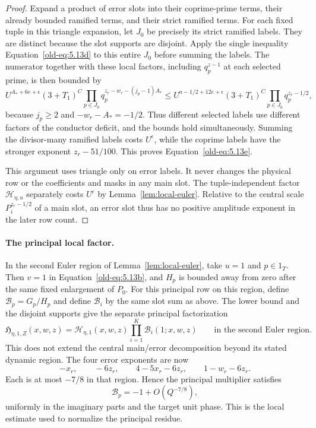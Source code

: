 \documentclass[11pt,a4paper]{article}
\numberwithin{equation}{section}
\numberwithin{figure}{section}
\theoremstyle{definition}
\theoremstyle{remark}
\begin{document}
\begin{proof}
Expand a product of error slots into their coprime-prime terms,
their already bounded ramified terms, and their strict ramified
terms.  For each fixed tuple in this triangle expansion, let $J_0$
be precisely its strict ramified labels.  They are distinct because
the slot supports are disjoint.  Apply the single inequality
Equation~\eqref{old-eq:5.13d} to this entire $J_0$ before summing
the labels.  The numerator together with these local factors,
including $q_p^{z-1}$ at each selected prime, is then bounded by
\[
 U^{A_*+6e+\epsilon}(3+T_1)^C
 \prod_{p\in J_0}q_p^{z_r-w_r-(j_p-1)A_*}
 \le U^{a-1/2+12e+\epsilon}(3+T_1)^C
       \prod_{p\in J_0}q_p^{z_r-1/2},
\]
because $j_p\ge2$ and $-w_r-A_*=-1/2$.  Thus different selected
labels use different factors of the conductor deficit, and the
bounds hold simultaneously.  Summing the divisor-many ramified labels costs
$U^\epsilon$, while the coprime labels have the stronger exponent
$z_r-51/100$.  This proves Equation~\eqref{old-eq:5.13e}.

This argument uses triangle only on error labels.  It never changes
the physical row or the coefficients and masks in any main slot.
The tuple-independent factor $\mathcal H_{\eta,u}$ separately costs
$U^\epsilon$ by Lemma~\ref{lem:local-euler}.  Relative to the
central scale $P_i^{z_r-1/2}$ of a main slot, an error slot thus
has no positive amplitude exponent in the later row count.
\end{proof}

\paragraph{The principal local factor.}
In the second Euler region of Lemma~\ref{lem:local-euler}, take
$u=1$ and $p\in1_T$.  Then $v=1$ in
Equation~\eqref{old-eq:5.13b}, and $H_p$ is bounded away from zero
after the same fixed enlargement of $P_0$.  For this principal row on
this region, define $\mathcal B_p=G_p/H_p$ and define $\mathcal B_i$
by the same slot sum as above.  The lower bound and the disjoint supports
give the separate principal factorization
\begin{equation}\label{eq:principal-slot-factorization}
 \mathfrak H_{\eta,1,Z}(x,w,z)
 =\mathcal H_{\eta,1}(x,w,z)\prod_{i=1}^K\mathcal B_i(1;x,w,z)
 \qquad\text{in the second Euler region}.
\end{equation}
This does not extend the central main/error decomposition beyond its stated
dynamic region.  The four error
exponents are now
\[
 -x_r,\qquad -6z_r,\qquad 4-5x_r-6z_r,
       \qquad 1-w_r-6z_r.
\]
Each is at most $-7/8$ in that region.  Hence the principal
multiplier satisfies
\begin{equation}\label{eq:principal-local-approximation}
 \mathcal B_p=-1+O(Q^{-7/8}),
\end{equation}
uniformly in the imaginary parts and the target unit phase.  This
is the local estimate used to normalize the principal residue.
\end{document}

